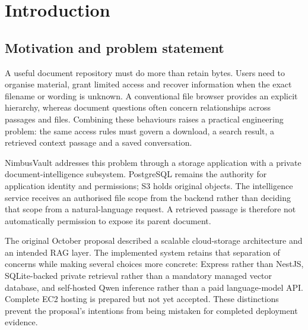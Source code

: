 \chapter{Introduction}
\section{Motivation and problem statement}
A useful document repository must do more than retain bytes. Users need to organise material, grant limited access and recover information when the exact filename or wording is unknown. A conventional file browser provides an explicit hierarchy, whereas document questions often concern relationships across passages and files. Combining these behaviours raises a practical engineering problem: the same access rules must govern a download, a search result, a retrieved context passage and a saved conversation.

NimbusVault addresses this problem through a storage application with a private document-intelligence subsystem. PostgreSQL remains the authority for application identity and permissions; S3 holds original objects. The intelligence service receives an authorised file scope from the backend rather than deciding that scope from a natural-language request. A retrieved passage is therefore not automatically permission to expose its parent document.

The original October proposal described a scalable cloud-storage architecture and an intended RAG layer. The implemented system retains that separation of concerns while making several choices more concrete: Express rather than NestJS, SQLite-backed private retrieval rather than a mandatory managed vector database, and self-hosted Qwen inference rather than a paid language-model API. Complete EC2 hosting is prepared but not yet accepted. These distinctions prevent the proposal's intentions from being mistaken for completed deployment evidence.
